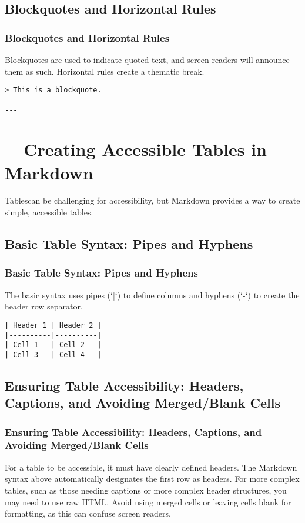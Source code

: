 \subsection{Blockquotes and Horizontal Rules}
\label{subsec:markdown-blockquotes-rules}
\subsubsection{Blockquotes and Horizontal Rules}
\label{ssubsec:markdown-blockquotes-rules-details}
Blockquotes are used to indicate quoted text, and screen readers will announce them as such. Horizontal rules create a thematic break.
\begin{verbatim}
> This is a blockquote.

---
\end{verbatim}

\section{~~Creating Accessible Tables in Markdown}
\label{sec:accessible-markdown-tables}
Tablescan be challenging for accessibility, but Markdown provides a way to create simple, accessible tables.

\subsection{Basic Table Syntax: Pipes and Hyphens}
\label{subsec:markdown-table-syntax}
\subsubsection{Basic Table Syntax: Pipes and Hyphens}
\label{ssubsec:markdown-table-syntax-details}
The basic syntax uses pipes (`|`) to define columns and hyphens (`-`) to create the header row separator.
\begin{verbatim}
| Header 1 | Header 2 |
|----------|----------|
| Cell 1   | Cell 2   |
| Cell 3   | Cell 4   |
\end{verbatim}

\subsection{Ensuring Table Accessibility: Headers, Captions, and Avoiding Merged/Blank Cells}
\label{subsec:markdown-table-accessibility}
\subsubsection{Ensuring Table Accessibility: Headers, Captions, and Avoiding Merged/Blank Cells}
\label{ssubsec:markdown-table-accessibility-details}
For a table to be accessible, it must have clearly defined headers. The Markdown syntax above automatically designates the first row as headers. For more complex tables, such as those needing captions or more complex header structures, you may need to use raw HTML. Avoid using merged cells or leaving cells blank for formatting, as this can confuse screen readers.

